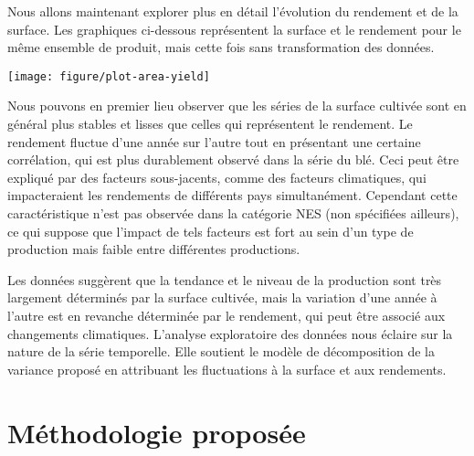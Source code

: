 \documentclass[nojss]{jss}\usepackage{graphicx, color}
\newenvironment{knitrout}{}{} %
\begin{document}
Nous allons maintenant explorer plus en d\'{e}tail l'\'{e}volution du
rendement et de la surface. Les graphiques ci-dessous repr\'{e}sentent
la surface et le rendement pour le même ensemble de produit, mais
cette fois sans transformation des donn\'{e}es.















\begin{knitrout}
\color{fgcolor}

{\centering \texttt{[image: figure/plot-area-yield]} 

}



\end{knitrout}


Nous pouvons en premier lieu observer que les s\'{e}ries de la surface
cultiv\'{e}e sont en g\'{e}n\'{e}ral plus stables et lisses que celles
qui repr\'{e}sentent le rendement. Le rendement fluctue d'une
ann\'{e}e sur l'autre tout en pr\'{e}sentant une certaine
corr\'{e}lation, qui est plus durablement observ\'{e} dans la
s\'{e}rie du bl\'{e}. Ceci peut être expliqu\'{e} par des facteurs
sous-jacents, comme des facteurs climatiques, qui impacteraient les
rendements de diff\'{e}rents pays simultan\'{e}ment. Cependant cette
caract\'{e}ristique n'est pas observ\'{e}e dans la cat\'{e}gorie NES
(non sp\'{e}cifi\'{e}es ailleurs), ce qui suppose que l'impact de tels
facteurs est fort au sein d'un type de production mais faible entre
diff\'{e}rentes productions.


Les donn\'{e}es sugg\`{e}rent que la tendance et le niveau de la
production sont tr\`{e}s largement d\'{e}termin\'{e}s par la surface
cultiv\'{e}e, mais la variation d'une ann\'{e}e \`{a} l'autre est en
revanche d\'{e}termin\'{e}e par le rendement, qui peut \^{e}tre
associ\'{e} aux changements climatiques. L'analyse exploratoire des
donn\'{e}es nous \'{e}claire sur la nature de la s\'{e}rie
temporelle. Elle soutient le mod\`{e}le de d\'{e}composition de la
variance propos\'{e} en attribuant les fluctuations \`{a} la surface
et aux rendements.





\section{M\'{e}thodologie propos\'{e}e}
\end{document}
